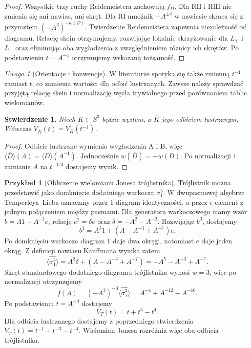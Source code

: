 \documentclass[11pt,a4paper]{report}
\numberwithin{equation}{section}
\theoremstyle{plain}
\newtheorem{stwierdzenie}[twierdzenie]{Stwierdzenie}
\theoremstyle{definition}
\newtheorem{przyklad}[twierdzenie]{Przykład}
\theoremstyle{remark}
\newtheorem{uwaga}[twierdzenie]{Uwaga}
\begin{document}
\begin{proof}
Wszystkie trzy ruchy Reidemeistera zachowują $f_D$.
Dla $\mathrm{R II}$ i $\mathrm{R III}$ nie zmienia się ani
nawias, ani skręt. Dla $\mathrm{R I}$ mnożnik $-A^{\pm3}$
w nawiasie skraca się z przyrostem $(-A^3)^{-w(D)}$.
Twierdzenie Reidemeistera zapewnia niezależność od diagramu.
Relację skein otrzymujemy, rozwijając lokalnie skrzyżowanie
dla $L_+$ i $L_-$ oraz eliminując oba wygładzenia z
uwzględnieniem różnicy ich skrętów. Po podstawieniu
$t=A^{-4}$ otrzymujemy wskazaną tożsamość.
\end{proof}

\begin{uwaga}[Orientacje i konwencje]
W literaturze spotyka się także zmienną $t^{-1}$ zamiast $t$,
co zamienia wartości dla odbić lustrzanych. Zawsze należy
sprawdzać przyjętą relację skein i normalizację węzła
trywialnego przed porównaniem tablic wielomianów.
\end{uwaga}

\begin{stwierdzenie}
Niech $K\subset S^3$ będzie węzłem, a $\overline K$ jego
odbiciem lustrzanym. Wówczas
$V_{\overline K}(t)=V_K(t^{-1})$.
\end{stwierdzenie}

\begin{proof}
Odbicie lustrzane wymienia wygładzenia A i B, więc
$\langle\overline D\rangle(A)=\langle D\rangle(A^{-1})$.
Jednocześnie $w(\overline D)=-w(D)$.
Po normalizacji i zamianie $A$ na $t^{-1/4}$ dostajemy wynik.
\end{proof}

\begin{przyklad}[Obliczenie wielomianu Jonesa trójlistnika]
Trójlistnik można przedstawić jako domknięcie dodatniego warkocza
$\sigma_1^3$. W dwupasmowej algebrze Temperleya--Lieba oznaczmy przez
$1$ diagram identyczności, a przez $e$ element z jednym połączeniem
między pasmami. Dla generatora warkoczowego mamy wzór
$b=A1+A^{-1}e$, relację $e^2=\delta e$ oraz
$\delta=-A^2-A^{-2}$.
Rozwijając $b^3$, dostajemy
\[
b^3=A^3 1+(A-A^{-3}+A^{-7})e.
\]
Po domknięciu warkocza diagram $1$ daje dwa okręgi, natomiast
$e$ daje jeden okrąg. Z definicji nawiasu Kauffmana wynika zatem
\[
\langle\widehat{\sigma_1^3}\rangle
=A^3\delta+(A-A^{-3}+A^{-7})
=-A^5-A^{-3}+A^{-7}.
\]
Skręt standardowego dodatniego diagramu trójlistnika wynosi $w=3$,
więc po normalizacji otrzymujemy
\[
f(A)=(-A^3)^{-3}\langle\widehat{\sigma_1^3}\rangle
=A^{-4}+A^{-12}-A^{-16}.
\]
Po podstawieniu $t=A^{-4}$ dostajemy
\[
V_T(t)=t+t^3-t^4.
\]
Dla odbicia lustrzanego dostajemy z poprzedniego stwierdzenia
$V_{\overline T}(t)=t^{-1}+t^{-3}-t^{-4}$. Wielomian Jonesa
rozróżnia więc oba odbicia trójlistnika.
\end{przyklad}
\end{document}

